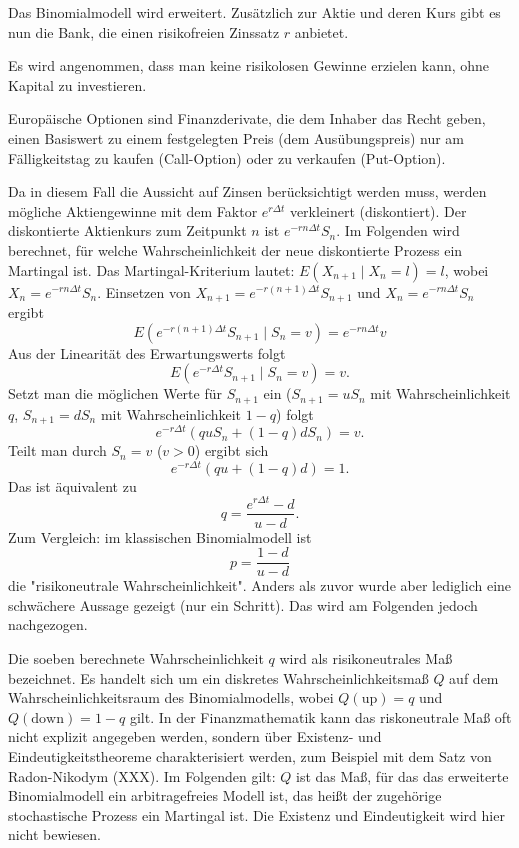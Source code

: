 Das Binomialmodell wird erweitert. Zusätzlich zur Aktie und deren Kurs gibt es nun die Bank, die einen risikofreien Zinssatz $r$ anbietet.

\begin{defi}
Es wird angenommen, dass man keine risikolosen Gewinne erzielen kann, ohne Kapital zu investieren.
\end{defi}

\begin{defi}
    Europäische Optionen sind Finanzderivate, die dem Inhaber das Recht geben, 
    einen Basiswert zu einem festgelegten Preis (dem Ausübungspreis) nur am 
    Fälligkeitstag zu kaufen (Call-Option) oder zu verkaufen (Put-Option).
\end{defi}


\begin{lemma}
Da in diesem Fall die Aussicht auf Zinsen berücksichtigt werden muss,
werden mögliche Aktiengewinne mit dem Faktor $e^{r \Delta t}$ verkleinert (diskontiert).
Der diskontierte Aktienkurs zum Zeitpunkt $n$ ist $e^{-r n \Delta t} S_n$.
Im Folgenden wird berechnet, für welche Wahrscheinlichkeit der neue diskontierte Prozess
ein Martingal ist. Das Martingal-Kriterium lautet: $E(X_{n+1} \mid X_n = l) = l$, wobei $X_n = e^{-r n \Delta t} S_n$.
Einsetzen von $X_{n+1} = e^{-r (n+1) \Delta t} S_{n+1}$ und $X_n = e^{-r n \Delta t} S_n$ ergibt
$$
E(e^{-r (n+1) \Delta t} S_{n+1} \mid S_n = v) = e^{-r n \Delta t} v
$$
Aus der Linearität des Erwartungswerts folgt
$$
E(e^{-r \Delta t} S_{n+1} \mid S_n=v) = v.
$$
Setzt man die möglichen Werte für $S_{n+1}$ ein ($S_{n+1} = u S_n$ mit Wahrscheinlichkeit $q$, $S_{n+1} = d S_n$ mit Wahrscheinlichkeit $1-q$) folgt
$$
e^{-r \Delta t} \left( q u S_n + (1-q) d S_n \right) = v.
$$
Teilt man durch $S_n = v$ ($v > 0$) ergibt sich
$$
e^{-r \Delta t} \left( q u + (1-q) d \right) = 1.
$$
Das ist äquivalent zu
$$
q = \frac{e^{r \Delta t} - d}{u - d}.
$$
Zum Vergleich: im klassischen Binomialmodell ist 
$$p = \frac{1 - d}{u - d}$$
die "risikoneutrale Wahrscheinlichkeit". Anders als zuvor
wurde aber lediglich eine schwächere Aussage gezeigt (nur ein Schritt). 
Das wird am Folgenden jedoch nachgezogen.

\end{lemma}

\begin{defi}
Die soeben berechnete Wahrscheinlichkeit $q$ wird als risikoneutrales Maß bezeichnet.
Es handelt sich um ein diskretes Wahrscheinlichkeitsmaß $Q$ auf dem Wahrscheinlichkeitsraum des Binomialmodells,
wobei $Q(\text{up})=q$ und $Q(\text{down})=1-q$ gilt. In der Finanzmathematik kann das
riskoneutrale Maß oft nicht explizit angegeben werden, sondern über Existenz- und Eindeutigkeitstheoreme
charakterisiert werden, zum Beispiel mit dem Satz von Radon-Nikodym (XXX). Im Folgenden gilt:
$Q$ ist das Maß, für das das erweiterte Binomialmodell ein arbitragefreies Modell ist, das 
heißt der zugehörige stochastische Prozess ein Martingal ist. Die Existenz und Eindeutigkeit
wird hier nicht bewiesen.
\end{defi}

